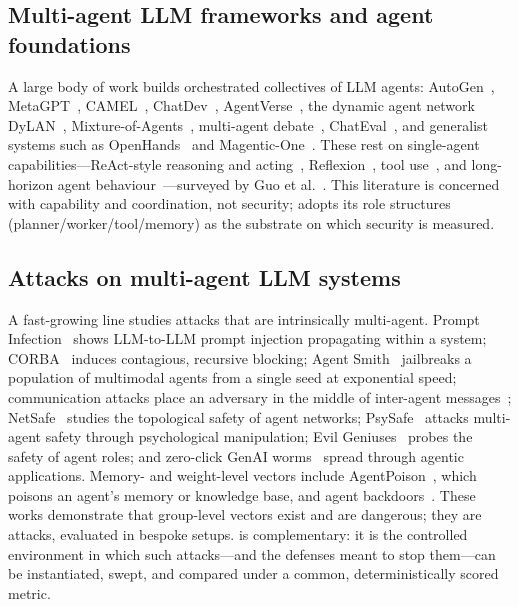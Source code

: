 \subsection{Multi-agent LLM frameworks and agent foundations}
A large body of work builds orchestrated collectives of LLM agents:
AutoGen~\cite{wu2023autogen}, MetaGPT~\cite{hong2023metagpt}, CAMEL~\cite{li2023camel},
ChatDev~\cite{qian2024chatdev}, AgentVerse~\cite{chen2024agentverse}, the dynamic agent
network DyLAN~\cite{liu2024dylan}, Mixture-of-Agents~\cite{wang2024mixture}, multi-agent
debate~\cite{du2023debate}, ChatEval~\cite{chan2023chateval}, and generalist systems
such as OpenHands~\cite{wang2025openhands} and Magentic-One~\cite{fourney2024magenticone}.
These rest on single-agent capabilities---ReAct-style reasoning and
acting~\cite{yao2023react}, Reflexion~\cite{shinn2023reflexion}, tool use~\cite{schick2023toolformer},
and long-horizon agent behaviour~\cite{park2023generative}---surveyed by Guo et al.~\cite{guo2024survey}.
This literature is concerned with capability and coordination, not security; 
adopts its role structures (planner/worker/tool/memory) as the substrate on which
security is measured.

\subsection{Attacks on multi-agent LLM systems}
A fast-growing line studies attacks that are intrinsically multi-agent. Prompt
Infection~\cite{lee2024promptinfection} shows LLM-to-LLM prompt injection propagating
within a system; CORBA~\cite{zhou2025corba} induces contagious, recursive blocking;
Agent Smith~\cite{gu2024agentsmith} jailbreaks a population of multimodal agents from a
single seed at exponential speed; communication attacks place an adversary
in the middle of inter-agent messages~\cite{he2025redteaming}; NetSafe~\cite{yu2024netsafe}
studies the topological safety of agent networks; PsySafe~\cite{zhang2024psysafe}
attacks multi-agent safety through psychological manipulation; Evil Geniuses~\cite{tian2023evilgeniuses}
probes the safety of agent roles; and zero-click GenAI worms~\cite{cohen2024aiworm}
spread through agentic applications. Memory- and weight-level vectors include
AgentPoison~\cite{chen2024agentpoison}, which poisons an agent's memory or knowledge
base, and agent backdoors~\cite{yang2024watchout}. These works demonstrate that
group-level vectors exist and are dangerous; they are attacks, evaluated in bespoke
setups.  is complementary: it is the controlled environment in which such
attacks---and the defenses meant to stop them---can be instantiated, swept, and
compared under a common, deterministically scored metric.


